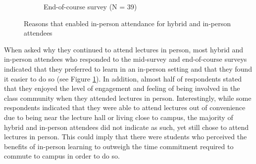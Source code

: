 \begin{figure}[H]
    \begin{subfigure}[t]{1\textwidth}
        \vspace{5mm}
        \centering
        \hspace{-10mm}
        \caption{End-of-course survey (N = 39)}
    \end{subfigure}
    \captionsetup{justification=centering}
    \caption{Reasons that enabled in-person attendance for hybrid and in-person attendees}
    \vspace{10mm}
    \label{fig:inperson_attendance_reasons}
\end{figure}

When asked why they continued to attend lectures in person, most hybrid and in-person attendees who responded to the mid-survey and end-of-course surveys indicated that they preferred to learn in an in-person setting and that they found it easier to do so (see Figure \ref{fig:inperson_attendance_reasons}). In addition, almost half of respondents stated that they enjoyed the level of engagement and feeling of being involved in the class community when they attended lectures in person. Interestingly, while some respondents indicated that they were able to attend lectures out of convenience due to being near the lecture hall or living close to campus, the majority of hybrid and in-person attendees did not indicate as such, yet still chose to attend lectures in person. This could imply that there were students who perceived the benefits of in-person learning to outweigh the time commitment required to commute to campus in order to do so.

